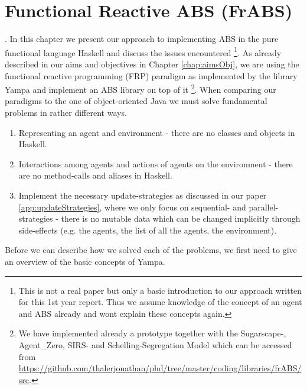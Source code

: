 \chapter{Functional Reactive ABS (FrABS)}
\label{app:frABS}.
In this chapter we present our approach to implementing ABS in the pure functional language Haskell and discuss the issues encountered \footnote{This is not a real paper but only a basic introduction to our approach written for this 1st year report. Thus we assume knowledge of the concept of an agent and ABS already and wont explain these concepts again.}. As already described in our aims and objectives in Chapter \ref{chap:aimsObj}, we are using the functional reactive programming (FRP) paradigm as implemented by the library Yampa and implement an ABS library on top of it \footnote{We have implemented already a prototype together with the Sugarscape-, Agent\_Zero, SIRS- and Schelling-Segregation Model which can be accessed from \url{https://github.com/thalerjonathan/phd/tree/master/coding/libraries/frABS/src}.}. When comparing our paradigms to the one of object-oriented Java we must solve fundamental problems in rather different ways.

\begin{enumerate}
	\item Representing an agent and environment - there are no classes and objects in Haskell.
	\item Interactions among agents and actions of agents on the environment - there are no method-calls and aliases in Haskell.
	\item Implement the necessary update-strategies as discussed in our paper \ref{app:updateStrategies}, where we only focus on sequential- and parallel-strategies - there is no mutable data which can be changed implicitly through side-effects (e.g. the agents, the list of all the agents, the environment).
\end{enumerate}

Before we can describe how we solved each of the problems, we first need to give an overview of the basic concepts of Yampa.

